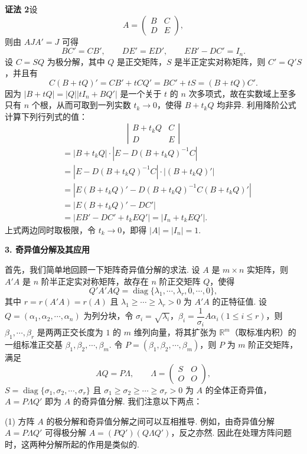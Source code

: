 \documentclass[UTF8,12pt,a4paper,fontset=fandol]{ctexart}
\begin{document}
\noindent\textbf{证法 2}\quad 设
\[
A=\begin{pmatrix}
B&C\\
D&E
\end{pmatrix},
\]
则由 $AJA'=J$ 可得
\[
BC'=CB',\qquad DE'=ED',\qquad EB'-DC'=I_n.
\]
设 $C=SQ$ 为极分解，其中 $Q$ 是正交矩阵，$S$ 是半正定实对称矩阵，则 $C'=Q'S$，并且有
\[
C(B+tQ)'=CB'+tCQ'=BC'+tS=(B+tQ)C'.
\]
因为 $|B+tQ|=|Q||tI_n+BQ'|$ 是一个关于 $t$ 的 $n$ 次多项式，故在实数域上至多只有 $n$ 个根，从而可取到一列实数 $t_k\to0$，使得 $B+t_kQ$ 均非异. 利用降阶公式计算下列行列式的值：
\[
\left|
\begin{matrix}
B+t_kQ&C\\
D&E
\end{matrix}
\right|
\]
\[
\begin{aligned}
&=|B+t_kQ|\cdot|E-D(B+t_kQ)^{-1}C|\\
&=|E-D(B+t_kQ)^{-1}C|\cdot|(B+t_kQ)'|\\
&=|E(B+t_kQ)'-D(B+t_kQ)^{-1}C(B+t_kQ)'|\\
&=|E(B+t_kQ)'-DC'|\\
&=|EB'-DC'+t_kEQ'|=|I_n+t_kEQ'|.
\end{aligned}
\]
上式两边同时取极限，令 $t_k\to0$，即得 $|A|=|I_n|=1$.

\noindent\textbf{3. 奇异值分解及其应用}

首先，我们简单地回顾一下矩阵奇异值分解的求法. 设 $A$ 是 $m\times n$ 实矩阵，则 $A'A$ 是 $n$ 阶半正定实对称矩阵，故存在 $n$ 阶正交矩阵 $Q$，使得
\[
Q'A'AQ=\operatorname{diag}\{\lambda_1,\cdots,\lambda_r,0,\cdots,0\},
\]
其中 $r=r(A'A)=r(A)$ 且 $\lambda_1\ge\cdots\ge\lambda_r>0$ 为 $A'A$ 的正特征值. 设 $Q=(\alpha_1,\alpha_2,\cdots,\alpha_n)$ 为列分块，令 $\sigma_i=\sqrt{\lambda_i}$，$\beta_i=\dfrac{1}{\sigma_i}A\alpha_i(1\le i\le r)$，则 $\beta_1,\cdots,\beta_r$ 是两两正交长度为 $1$ 的 $m$ 维列向量，将其扩张为 $\mathbb{R}^m$（取标准内积）的一组标准正交基 $\beta_1,\beta_2,\cdots,\beta_m$. 令 $P=(\beta_1,\beta_2,\cdots,\beta_m)$，则 $P$ 为 $m$ 阶正交矩阵，满足
\[
AQ=P\Lambda,\qquad
\Lambda=\begin{pmatrix}
S&O\\
O&O
\end{pmatrix},
\]
$S=\operatorname{diag}\{\sigma_1,\sigma_2,\cdots,\sigma_r\}$ 且 $\sigma_1\ge\sigma_2\ge\cdots\ge\sigma_r>0$ 为 $A$ 的全体正奇异值，$A=P\Lambda Q'$ 即为 $A$ 的奇异值分解. 我们注意以下两点：

(1) 方阵 $A$ 的极分解和奇异值分解之间可以互相推导. 例如，由奇异值分解 $A=P\Lambda Q'$ 可得极分解 $A=(PQ')(Q\Lambda Q')$，反之亦然. 因此在处理方阵问题时，这两种分解所起的作用是类似的.
\end{document}
